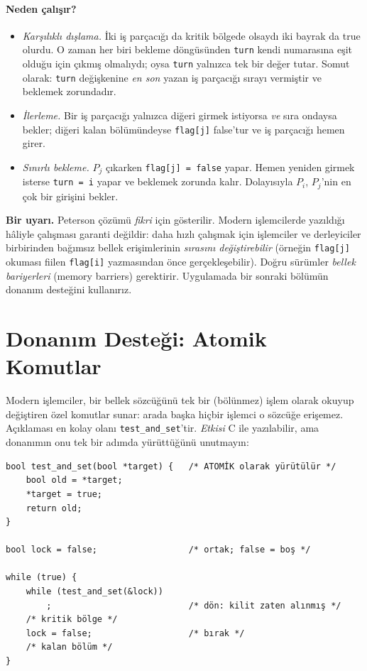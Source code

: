 \paragraph{Neden çalışır?}
\begin{itemize}
  \item \emph{Karşılıklı dışlama.} İki iş parçacığı da kritik bölgede olsaydı iki bayrak da true olurdu. O zaman her biri bekleme döngüsünden \texttt{turn} kendi numarasına eşit olduğu için çıkmış olmalıydı; oysa \texttt{turn} yalnızca tek bir değer tutar. Somut olarak: \texttt{turn} değişkenine \emph{en son} yazan iş parçacığı sırayı vermiştir ve beklemek zorundadır.
  \item \emph{İlerleme.} Bir iş parçacığı yalnızca diğeri girmek istiyorsa \emph{ve} sıra ondaysa bekler; diğeri kalan bölümündeyse \texttt{flag[j]} false'tur ve iş parçacığı hemen girer.
  \item \emph{Sınırlı bekleme.} $P_j$ çıkarken \texttt{flag[j] = false} yapar. Hemen yeniden girmek isterse \texttt{turn = i} yapar ve beklemek zorunda kalır. Dolayısıyla $P_i$, $P_j$'nin en çok bir girişini bekler.
\end{itemize}

\textbf{Bir uyarı.} Peterson çözümü \emph{fikri} için gösterilir. Modern işlemcilerde yazıldığı hâliyle çalışması garanti değildir: daha hızlı çalışmak için işlemciler ve derleyiciler birbirinden bağımsız bellek erişimlerinin \emph{sırasını değiştirebilir} (örneğin \texttt{flag[j]} okuması fiilen \texttt{flag[i]} yazmasından önce gerçekleşebilir). Doğru sürümler \emph{bellek bariyerleri} (memory barriers) gerektirir. Uygulamada bir sonraki bölümün donanım desteğini kullanırız.

\section{Donanım Desteği: Atomik Komutlar}

Modern işlemciler, bir bellek sözcüğünü tek bir  (bölünmez) işlem olarak okuyup değiştiren özel komutlar sunar: arada başka hiçbir işlemci o sözcüğe erişemez. Açıklaması en kolay olanı \texttt{test\_and\_set}'tir. \emph{Etkisi} C ile yazılabilir, ama donanımın onu tek bir adımda yürüttüğünü unutmayın:

\begin{lstlisting}
bool test_and_set(bool *target) {   /* ATOMİK olarak yürütülür */
    bool old = *target;
    *target = true;
    return old;
}

bool lock = false;                  /* ortak; false = boş */

while (true) {
    while (test_and_set(&lock))
        ;                           /* dön: kilit zaten alınmış */
    /* kritik bölge */
    lock = false;                   /* bırak */
    /* kalan bölüm */
}
\end{lstlisting}

